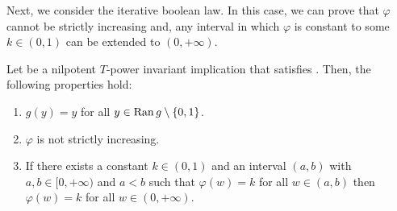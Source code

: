 
Next, we consider the iterative boolean law. In this case, we can prove that $\varphi$ cannot be strictly increasing and, any interval in which $\varphi$ is constant to some $k \in (0,1)$ can be extended to $(0,+\infty)$.

\begin{lemma}\label{lem:nilpotent:(IB)}
Let \IT be a nilpotent $T$-power invariant implication that satisfies \IB. Then, the following properties hold:
\begin{enumerate}[label=(\roman*)]
	\item $g(y)=y$ for all $y \in \operatorname{Ran} g \setminus \{0,1\}$.
	\item $\varphi$ is not strictly increasing.
	\item If there exists a constant $k \in (0,1)$ and an interval $(a,b)$ with $a,b \in [0,+\infty)$ and $a<b$ such that $\varphi(w)=k$ for all $w \in (a,b)$ then $\varphi(w)=k$ for all $w \in (0,+\infty)$.
\end{enumerate}
\end{lemma}

